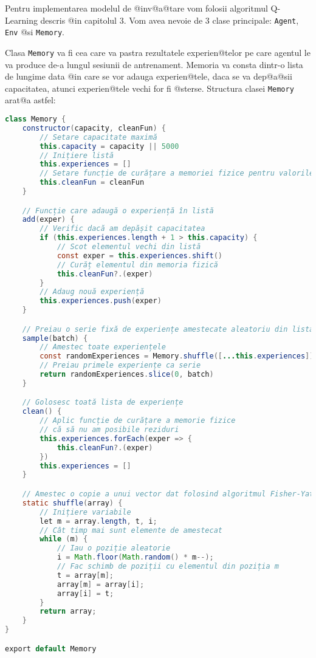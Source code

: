 Pentru implementarea modelul de @inv@a@tare vom folosii algoritmul Q-Learning descris @in capitolul 3. Vom avea nevoie de 3 clase principale: \texttt{Agent}, \texttt{Env} @si \texttt{Memory}.

Clasa \texttt{Memory} va fi cea care va pastra rezultatele experien@telor pe care agentul le va produce de-a lungul sesiunii de antrenament. Memoria va consta dintr-o lista de lungime data @in care se vor adauga experien@tele, daca se va dep@a@sii capacitatea, atunci experien@tele vechi for fi @sterse. Structura clasei \texttt{Memory} arat@a astfel:

\begin{lstlisting}[language=Java, caption={Structura clasei Memory}]
class Memory {
    constructor(capacity, cleanFun) {
        // Setare capacitate maximă
        this.capacity = capacity || 5000
        // Inițiere listă
        this.experiences = []
        // Setare funcție de curățare a memoriei fizice pentru valorile care vor fi distruse
        this.cleanFun = cleanFun
    }

    // Funcție care adaugă o experiență în listă
    add(exper) {
        // Verific dacă am depășit capacitatea
        if (this.experiences.length + 1 > this.capacity) {
            // Scot elementul vechi din listă
            const exper = this.experiences.shift()
            // Curăț elementul din memoria fizică
            this.cleanFun?.(exper)
        }
        // Adaug nouă experiență
        this.experiences.push(exper)
    }

    // Preiau o serie fixă de experiențe amestecate aleatoriu din lista
    sample(batch) {
        // Amestec toate experiențele
        const randomExperiences = Memory.shuffle([...this.experiences])
        // Preiau primele experiențe ca serie
        return randomExperiences.slice(0, batch)
    }

    // Golosesc toată lista de experiențe
    clean() {
        // Aplic funcție de curățare a memorie fizice
        // că să nu am posibile reziduri
        this.experiences.forEach(exper => {
            this.cleanFun?.(exper)
        })
        this.experiences = []
    }

    // Amestec o copie a unui vector dat folosind algoritmul Fisher-Yates
    static shuffle(array) {
        // Inițiere variabile
        let m = array.length, t, i;
        // Cât timp mai sunt elemente de amestecat
        while (m) {
            // Iau o poziție aleatorie
            i = Math.floor(Math.random() * m--);
            // Fac schimb de poziții cu elementul din poziția m
            t = array[m];
            array[m] = array[i];
            array[i] = t;
        }
        return array;
    }
}

export default Memory
\end{lstlisting}

